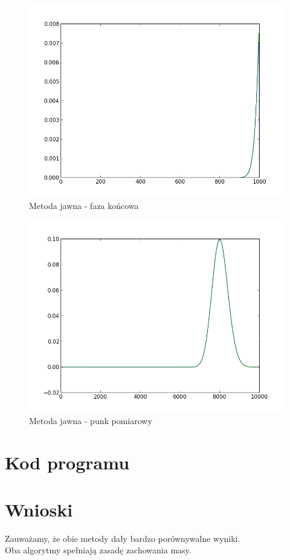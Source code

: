 \documentclass[a4paper,12pt]{article}
\begin{document}
	\begin{figure}
	\hspace{-100px}
	\includegraphics{plots2/00199}
	\caption{Metoda jawna - faza końcowa}
	\label{l5-3}
	\end{figure}
	\begin{figure}
	\hspace{-100px}
	\includegraphics{plots2/hist}
	\caption{Metoda jawna - punk pomiarowy}
	\label{l5-hist}
	\end{figure}
	\section{Kod programu}
	
	\section{Wnioski}
	Zauważamy, że obie metody dały bardzo porównywalne wyniki.\\
	Oba algorytmy spełniają zasadę zachowania masy.
\end{document}
